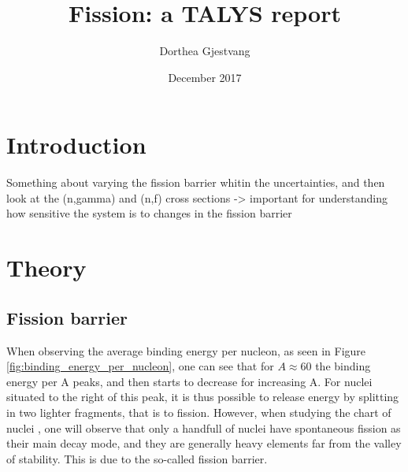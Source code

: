 \documentclass[]{article}
\title{}
\author{}
\begin{document}
	
\title{Fission: a TALYS report}
\author{Dorthea Gjestvang }
\date{December 2017}

\maketitle

\begin{abstract}

\end{abstract}

\section{Introduction}

Something about varying the fission barrier whitin the uncertainties, and then look at the (n,gamma) and (n,f) cross sections -> important for understanding how sensitive the system is to changes in the fission barrier

\section{Theory}
\subsection{Fission barrier}
When observing the average binding energy per nucleon, as seen in Figure \ref{fig:binding_energy_per_nucleon}, one can see that for $A \approx 60$ the binding energy per A peaks, and then starts to decrease for increasing A. For nuclei situated to the right of this peak, it is thus possible to release energy by splitting in two lighter fragments, that is to fission. However, when studying the chart of nuclei , one will observe that only a handfull of nuclei have spontaneous fission as their main decay mode, and they are generally heavy elements far from the valley of stability. This  is due to the so-called fission barrier. 
\par
\vspace{3mm}
\end{document}
